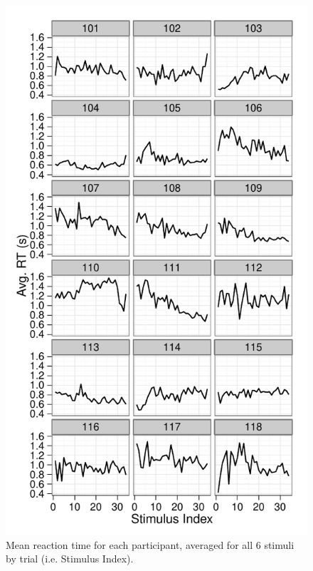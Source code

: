 \documentclass[doc,12pt]{apa}        %
\begin{document}
\begin{figure}[tp]
	\includegraphics{f_all_sS_rt}
    \centering
	\caption{Mean reaction time for each participant, averaged for all 6 stimuli by trial (i.e. Stimulus Index).}
	\label{fig:srt}
\end{figure}
\end{document}
